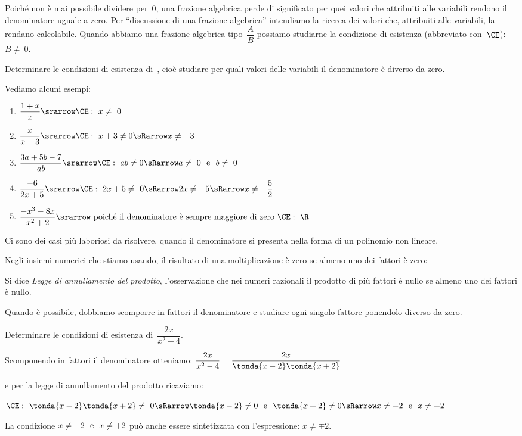 Poiché non è mai possibile dividere per~\(0\), una frazione algebrica perde 
di significato per quei valori che attribuiti alle variabili rendono il 
denominatore uguale a zero. 
Per ``discussione di una frazione algebrica'' intendiamo la ricerca dei 
valori che, attribuiti alle variabili, la rendano calcolabile. 
Quando abbiamo una frazione algebrica tipo~\(\dfrac{A}{B}\) possiamo 
studiarne la condizione di esistenza (abbreviato con~\(\CE\)):~\(B\neq~0\).

 \begin{esempio}
Determinare le condizioni di esistenza di~, cioè studiare 
per quali valori delle variabili il denominatore è diverso da zero.

Vediamo alcuni esempi:

\begin{enumerate}
\item \(\dfrac{1+x}{x} \srarrow \CE:~ x\neq~0\)
\item \(\dfrac{x}{x+3} \srarrow \CE:~ x+3 \neq 0 \sRarrow x \neq -3\)
\item \(\dfrac{3a+5b-7}{ab} \srarrow 
\CE:~ ab \neq 0 \sRarrow a\neq~0 \stext{e} b\neq~0\)
\item \(\dfrac{-6}{2x+5} \srarrow 
\CE:~ 2x+5\neq~0 \sRarrow 2x \neq -5 \sRarrow x\neq -\dfrac{5}{2}\)
\item \(\dfrac{-x^{3}-8x}{x^{2}+2} \srarrow 
\text{ poiché il denominatore è sempre maggiore di zero } \CE:~\R \)
\end{enumerate}
\end{esempio}

Ci sono dei casi più laboriosi da risolvere, quando il denominatore si 
presenta nella forma di un polinomio non lineare.

Negli insiemi numerici che stiamo usando, il risultato di una moltiplicazione 
è zero se almeno uno dei fattori è zero:

\begin{definizione}
Si dice \emph{Legge di annullamento del prodotto}, l'osservazione che nei 
numeri razionali il prodotto di più fattori è nullo se almeno uno dei fattori 
è nullo.
\end{definizione}

Quando è possibile, dobbiamo scomporre in fattori il denominatore e studiare 
ogni singolo fattore ponendolo diverso da zero.

 \begin{esempio}
Determinare le condizioni di esistenza di~\(\dfrac{2x}{x^{2}-4}\).

Scomponendo in fattori il denominatore otteniamo:
\(\dfrac{2x}{x^{2}-4} = \dfrac{2x}{\tonda{x-2}\tonda{x+2}}\)

e per la legge di annullamento del prodotto ricaviamo:

\(\CE:~ \tonda{x-2}\tonda{x+2} \neq~0 \sRarrow 
\tonda{x-2} \neq 0 \stext{e} \tonda{x+2} \neq 0 \sRarrow 
x \neq -2 \stext{e} x \neq +2\)

La condizione \(x \neq -2 \text{~~e~~} x \neq +2\) può anche essere sintetizzata 
con l'espressione: \(x \neq \mp 2\).
 \end{esempio}

